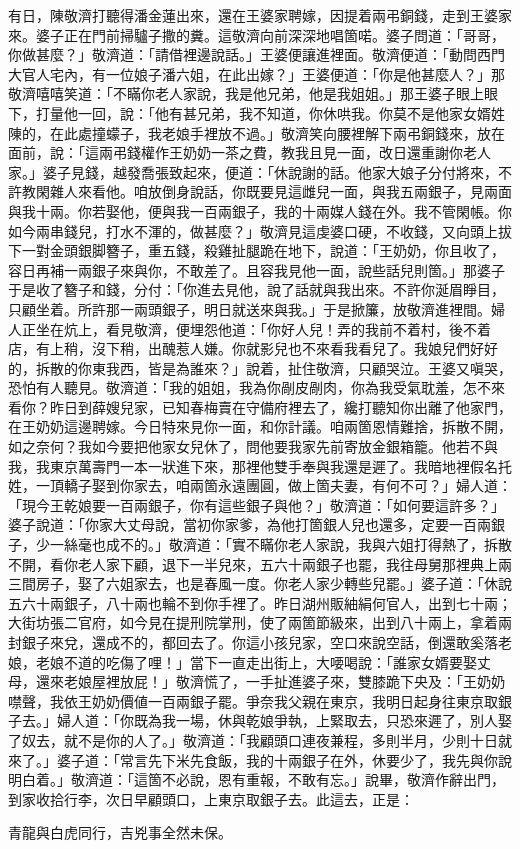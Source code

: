 有日，陳敬濟打聽得潘金蓮出來，還在王婆家聘嫁，因提着兩弔銅錢，走到王婆家來。婆子正在門前掃驢子撒的糞。這敬濟向前深深地唱箇喏。婆子問道：「哥哥，你做甚麼？」敬濟道：「請借裡邊說話。」王婆便讓進裡面。敬濟便道：「動問西門大官人宅內，有一位娘子潘六姐，在此出嫁？」王婆便道：「你是他甚麼人？」那敬濟嘻嘻笑道：「不瞞你老人家說，我是他兄弟，他是我姐姐。」那王婆子眼上眼下，打量他一回，說：「他有甚兄弟，我不知道，你休哄我。你莫不是他家女婿姓陳的，在此處撞蠓子，{}我老娘手裡放不過。」敬濟笑向腰裡解下兩弔銅錢來，放在面前，說：「這兩弔錢權作王奶奶一茶之費，教我且見一面，改日還重謝你老人家。」婆子見錢，越發喬張致起來，便道：「休說謝的話。他家大娘子分付將來，不許教閑雜人來看他。咱放倒身說話，你既要見這雌兒一面，與我五兩銀子，見兩面與我十兩。你若娶他，便與我一百兩銀子，我的十兩媒人錢在外。{}我不管閑帳。你如今兩串錢兒，打水不渾的，做甚麼？」敬濟見這虔婆口硬，不收錢，又向頭上拔下一對金頭銀脚簪子，重五錢，殺雞扯腿跪在地下，說道：「王奶奶，你且收了，容日再補一兩銀子來與你，不敢差了。且容我見他一面，說些話兒則箇。」那婆子于是收了簪子和錢，分付：「你進去見他，說了話就與我出來。不許你涎眉睜目，只顧坐着。{}所許那一兩頭銀子，明日就送來與我。」于是掀簾，放敬濟進裡間。婦人正坐在炕上，看見敬濟，便埋怨他道：「你好人兒！弄的我前不着村，後不着店，有上稍，沒下稍，出醜惹人嫌。你就影兒也不來看我看兒了。我娘兒們好好的，拆散的你東我西，皆是為誰來？」說着，扯住敬濟，只顧哭泣。王婆又嗔哭，恐怕有人聽見。敬濟道：「我的姐姐，我為你剮皮剮肉，你為我受氣耽羞，怎不來看你？昨日到薛嫂兒家，已知春梅賣在守備府裡去了，纔打聽知你出離了他家門，在王奶奶這邊聘嫁。今日特來見你一面，和你計議。咱兩箇恩情難捨，拆散不開，如之奈何？我如今要把他家女兒休了，問他要我家先前寄放金銀箱籠。他若不與我，我東京萬壽門一本一狀進下來，那裡他雙手奉與我還是遲了。我暗地裡假名托姓，一頂轎子娶到你家去，咱兩箇永遠團圓，做上箇夫妻，有何不可？」婦人道：「現今王乾娘要一百兩銀子，你有這些銀子與他？」敬濟道：「如何要這許多？」婆子說道：「你家大丈母說，當初你家爹，為他打箇銀人兒也還多，定要一百兩銀子，少一絲毫也成不的。」敬濟道：「實不瞞你老人家說，我與六姐打得熱了，拆散不開，看你老人家下顧，退下一半兒來，五六十兩銀子也罷，我往母舅那裡典上兩三間房子，娶了六姐家去，也是春風一度。你老人家少轉些兒罷。」婆子道：「休說五六十兩銀子，八十兩也輪不到你手裡了。昨日湖州販紬絹何官人，{}出到七十兩；大街坊張二官府，如今見在提刑院掌刑，使了兩箇節級來，出到八十兩上，拿着兩封銀子來兌，還成不的，都回去了。你這小孩兒家，空口來說空話，倒還敢奚落老娘，老娘不道的吃傷了哩！」當下一直走出街上，大喓喝說：「誰家女婿要娶丈母，還來老娘屋裡放屁！」{}敬濟慌了，一手扯進婆子來，雙膝跪下央及：「王奶奶噤聲，我依王奶奶價値一百兩銀子罷。爭奈我父親在東京，我明日起身往東京取銀子去。」婦人道：「你既為我一場，休與乾娘爭執，上緊取去，只恐來遲了，別人娶了奴去，就不是你的人了。」敬濟道：「我顧頭口連夜兼程，多則半月，少則十日就來了。」婆子道：「常言先下米先食飯，我的十兩銀子在外，休要少了，{}我先與你說明白着。」敬濟道：「這箇不必說，恩有重報，不敢有忘。」說畢，敬濟作辭出門，到家收拾行李，次日早顧頭口，上東京取銀子去。此這去，正是：

\begin{myquote}
青龍與白虎同行，吉兇事全然未保。
\end{myquote}

